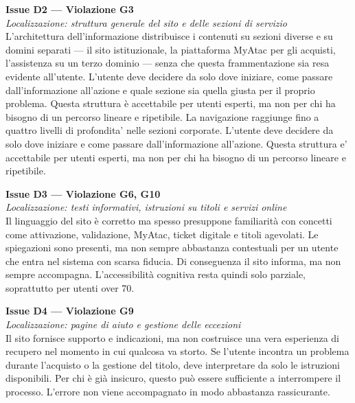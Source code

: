 ﻿\documentclass[11pt,a4paper]{article}
\begin{document}
\bigskip

\noindent\textbf{Issue D2 — Violazione G3}\label{atac:D2}\\
\textit{Localizzazione: struttura generale del sito e delle sezioni di servizio}\\

\noindent L’architettura dell’informazione distribuisce i contenuti su sezioni diverse e su domini separati --- il sito istituzionale, la piattaforma MyAtac per gli acquisti, l'assistenza su un terzo dominio --- senza che questa frammentazione sia resa evidente all’utente. L’utente deve decidere da solo dove iniziare, come passare dall’informazione all’azione e quale sezione sia quella giusta per il proprio problema. Questa struttura è accettabile per utenti esperti, ma non per chi ha bisogno di un percorso lineare e ripetibile. La navigazione raggiunge fino a quattro livelli di profondita' nelle sezioni corporate. L'utente deve decidere da solo dove iniziare e come passare dall'informazione all'azione. Questa struttura e' accettabile per utenti esperti, ma non per chi ha bisogno di un percorso lineare e ripetibile.

\bigskip

\noindent\textbf{Issue D3 — Violazione G6, G10}\label{atac:D3}\\
\textit{Localizzazione: testi informativi, istruzioni su titoli e servizi online}\\

\noindent Il linguaggio del sito è corretto ma spesso presuppone familiarità con concetti come attivazione, validazione, MyAtac, ticket digitale e titoli agevolati. Le spiegazioni sono presenti, ma non sempre abbastanza contestuali per un utente che entra nel sistema con scarsa fiducia. Di conseguenza il sito informa, ma non sempre accompagna. L’accessibilità cognitiva resta quindi solo parziale, soprattutto per utenti over 70.

\bigskip

\noindent\textbf{Issue D4 — Violazione G9}\label{atac:D4}\\
\textit{Localizzazione: pagine di aiuto e gestione delle eccezioni}\\

\noindent Il sito fornisce supporto e indicazioni, ma non costruisce una vera esperienza di recupero nel momento in cui qualcosa va storto. Se l’utente incontra un problema durante l’acquisto o la gestione del titolo, deve interpretare da solo le istruzioni disponibili. Per chi è già insicuro, questo può essere sufficiente a interrompere il processo. L’errore non viene accompagnato in modo abbastanza rassicurante.
\end{document}
